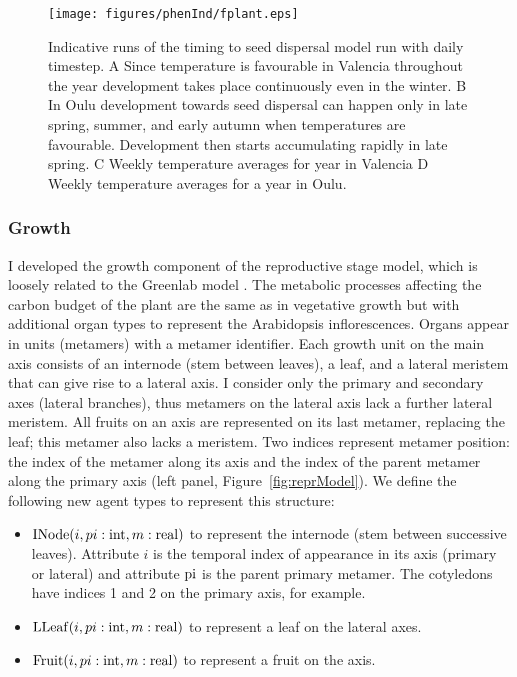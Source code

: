 \begin{figure}[tb]
  \centering
  \texttt{[image: figures/phenInd/fplant.eps]}
  \caption{Indicative runs of the timing to seed dispersal model run with daily
    timestep. A Since temperature is favourable in Valencia throughout the year
    development takes place continuously even in the winter. B In Oulu
    development towards seed dispersal can happen only in late spring, summer,
    and early autumn when temperatures are favourable. Development then starts
    accumulating rapidly in late spring. C Weekly temperature averages for year
    in Valencia D Weekly temperature averages for a year in Oulu.}
  \label{fig:reprInd}
\end{figure}

\subsubsection*{Growth}
\label{growth-1}

I developed the growth component of the reproductive stage model, which is
loosely related to the Greenlab model \citep{christophe_model-based_2008}. The
metabolic processes affecting the carbon budget of the plant are the same as in
vegetative growth but with additional organ types to represent the Arabidopsis
inflorescences. Organs appear in units (metamers) with a metamer
identifier. Each growth unit on the main axis consists of an internode (stem
between leaves), a leaf, and a lateral meristem that can give rise to a lateral
axis. I consider only the primary and secondary axes (lateral branches), thus
metamers on the lateral axis lack a further lateral meristem. All fruits on an
axis are represented on its last metamer, replacing the leaf; this metamer also
lacks a meristem.  Two indices represent metamer position: the index of the
metamer along its axis and the index of the parent metamer along the primary
axis (left panel, Figure~\ref{fig:reprModel}). We define the following new agent
types to represent this structure:

\begin{itemize}
\item
  \(\mathrm{INode}(i,pi:\mathrm{int},m:\mathrm{real})\) to represent the
  internode (stem between successive leaves). Attribute \(i\) is the
  temporal index of appearance in its axis (primary or lateral) and
  attribute \(\mathrm{pi}\) is the parent primary metamer. The cotyledons
  have indices 1 and 2 on the primary axis, for example.
\item
  \(\mathrm{LLeaf}(i,pi:\mathrm{int},m:\mathrm{real})\) to represent a leaf on
  the lateral axes.
\item
  \(\mathrm{Fruit}(i,pi:\mathrm{int},m:\mathrm{real})\) to represent a fruit
  on the axis.
\end{itemize}

